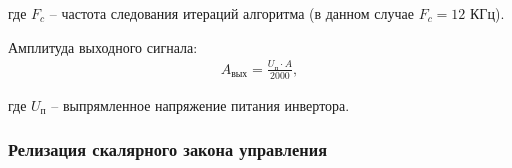         где $F_c$ -- частота следования итераций алгоритма (в данном случае $F_c = 12$ КГц).

        Амплитуда выходного сигнала:
        \begin{gather*}
            A_\text{вых} = \frac{U_\text{п} \cdot A}{2000},
        \end{gather*}

        где $U_\text{п}$ -- выпрямленное напряжение питания инвертора. 

    \subsubsection{Релизация скалярного закона управления}
        
